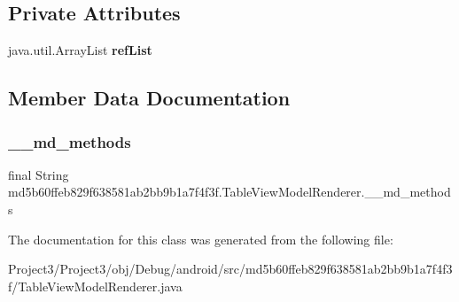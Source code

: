 \subsection*{Private Attributes}
\begin{DoxyCompactItemize}
\item 
\mbox{\label{classmd5b60ffeb829f638581ab2bb9b1a7f4f3f_1_1TableViewModelRenderer_a367cc615fe3d215e4dd9e298f20d871a}} 
java.\+util.\+Array\+List {\bfseries ref\+List}
\end{DoxyCompactItemize}


\subsection{Member Data Documentation}
\mbox{\label{classmd5b60ffeb829f638581ab2bb9b1a7f4f3f_1_1TableViewModelRenderer_a21b72c97f46fee0f30a471fc36c20e2c}} 
\subsubsection{\texorpdfstring{\+\_\+\+\_\+md\+\_\+methods}{\_\_md\_methods}}
{\footnotesize\ttfamily final String md5b60ffeb829f638581ab2bb9b1a7f4f3f.\+Table\+View\+Model\+Renderer.\+\_\+\+\_\+md\+\_\+methods\hspace{0.3cm}{\ttfamily [static]}}



The documentation for this class was generated from the following file\+:\begin{DoxyCompactItemize}
\item 
Project3/\+Project3/obj/\+Debug/android/src/md5b60ffeb829f638581ab2bb9b1a7f4f3f/Table\+View\+Model\+Renderer.\+java\end{DoxyCompactItemize}
